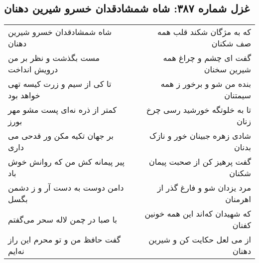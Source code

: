 \begin{center}
\section*{غزل شماره ۳۸۷: شاه شمشادقدان خسرو شیرین دهنان}
\label{sec:sh387}
\begin{longtable}{l p{0.5cm} r}
شاه شمشادقدان خسرو شیرین دهنان
&&
که به مژگان شکند قلب همه صف شکنان
\\
مست بگذشت و نظر بر من درویش انداخت
&&
گفت ای چشم و چراغ همه شیرین سخنان
\\
تا کی از سیم و زرت کیسه تهی خواهد بود
&&
بنده من شو و برخور ز همه سیمتنان
\\
کمتر از ذره نه‌ای پست مشو مهر بورز
&&
تا به خلوتگه خورشید رسی چرخ زنان
\\
بر جهان تکیه مکن ور قدحی می داری
&&
شادی زهره جبینان خور و نازک بدنان
\\
پیر پیمانه کش من که روانش خوش باد
&&
گفت پرهیز کن از صحبت پیمان شکنان
\\
دامن دوست به دست آر و ز دشمن بگسل
&&
مرد یزدان شو و فارغ گذر از اهرمنان
\\
با صبا در چمن لاله سحر می‌گفتم
&&
که شهیدان که‌اند این همه خونین کفنان
\\
گفت حافظ من و تو محرم این راز نه‌ایم
&&
از می لعل حکایت کن و شیرین دهنان
\\
\end{longtable}
\end{center}
